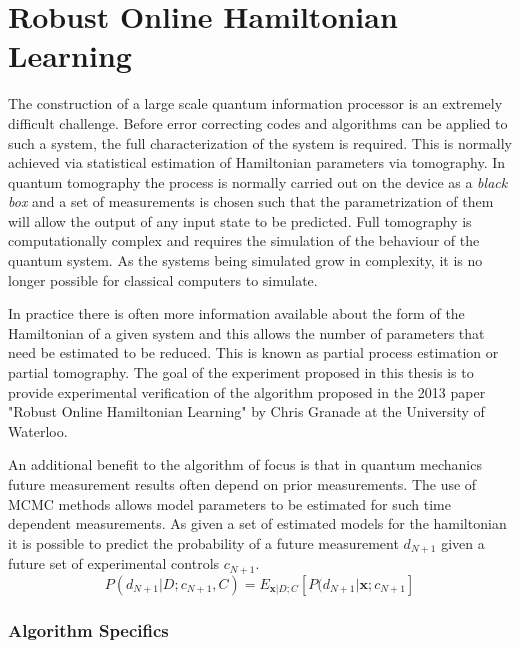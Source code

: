 \section{Robust Online Hamiltonian Learning}
\label{sec:robusthamiltonian}
The construction of a large scale quantum information processor is an extremely difficult challenge. Before error correcting codes and algorithms can be applied to such a system, the full characterization of the system is required. This is normally achieved via statistical estimation of Hamiltonian parameters via tomography. In quantum tomography the process is normally carried out on the device as a \textit{black box} and a set of measurements is chosen such that the parametrization of them will allow the output of any input state to be predicted.\cite{tomography} Full tomography is computationally complex and requires the simulation of the behaviour of the quantum system. As the systems being simulated grow in complexity, it is no longer possible for classical computers to simulate.\cite{simulate}

In practice there is often more information available about the form of the Hamiltonian of a given system and this allows the number of parameters that need be estimated to be reduced. This is known as partial process estimation or partial tomography. The goal of the experiment proposed in this thesis is to provide experimental verification of the algorithm proposed in the 2013 paper "Robust Online Hamiltonian Learning" by Chris Granade at the University of Waterloo.\cite{hamiltonian_learning} 

An additional benefit to the algorithm of focus is that in quantum mechanics future measurement results often depend on prior measurements. The use of MCMC methods allows model parameters to be estimated for such time dependent measurements. As given a set of estimated models for the hamiltonian it is possible to predict the probability of a future measurement $d_{N+1}$ given a future set of experimental controls $c_{N+1}$. 
\begin{equation}
P(d_{N+1}\big|D;c_{N+1},C) = E_{\mathbf{x}|D;C}[P(d_{N+1}\big|\mathbf{x};c_{N+1}]
\label{eq:batch}
\end{equation}

\subsubsection{Algorithm Specifics}
